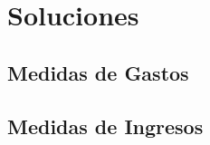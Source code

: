 \documentclass[aspectratio=169,10pt]{beamer}
\begin{document}
%


%
%





%
%
%

%
%
%

%
%
%
%
%

\section{Soluciones}
\subsection{Medidas de Gastos}

\subsection{Medidas de Ingresos}




%
%
\end{document}

